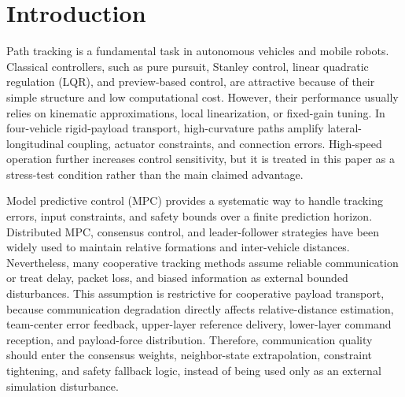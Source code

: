 \documentclass[twocolumn,3p,times,procedia]{elsarticle}
\newif\ifNRReview
\newcommand{\reviewblock}[1]{\ifNRReview\par\smallskip\noindent\begingroup\setlength{\fboxsep}{4pt}\colorbox{yellow!35}{\parbox{0.96\linewidth}{\footnotesize\textbf{当前不足：} #1}}\endgroup\par\smallskip\fi}
\newcommand{\AKE}{AKE-M}
\begin{document}
\reviewblock{回头弯同初始条件面板中，高曲率抗扰分支的团队中心横向 RMSE 降至 0.0851 m、峰值降至 0.1804 m，满足 0.2 m 内的峰值目标；但最终货物保护版本为了降低合力会牺牲部分横向误差，不能写成“全过程严格小于基线”。15 m/s 正弦已由进度过强版本更新为局部平衡版本，可跑完整且横向 RMSE 从 0.1586 m 降至 0.1574 m、纵向 RMSE 从 0.8857 m 降至 0.8815 m；但最大逐点正 gap 仍为 0.0041 m，因此只能写作 RMSE/峰值改善，不能写作全过程严格逐点优于基线。载荷力峰值在若干场景中高于 \AKE{}，因此受力指标仍应作为代价审计项。}


\section{Introduction}

Path tracking is a fundamental task in autonomous vehicles and mobile robots. Classical controllers, such as pure pursuit, Stanley control, linear quadratic regulation (LQR), and preview-based control, are attractive because of their simple structure and low computational cost. However, their performance usually relies on kinematic approximations, local linearization, or fixed-gain tuning. In four-vehicle rigid-payload transport, high-curvature paths amplify lateral-longitudinal coupling, actuator constraints, and connection errors. High-speed operation further increases control sensitivity, but it is treated in this paper as a stress-test condition rather than the main claimed advantage.

Model predictive control (MPC) provides a systematic way to handle tracking errors, input constraints, and safety bounds over a finite prediction horizon. Distributed MPC, consensus control, and leader-follower strategies have been widely used to maintain relative formations and inter-vehicle distances. Nevertheless, many cooperative tracking methods assume reliable communication or treat delay, packet loss, and biased information as external bounded disturbances. This assumption is restrictive for cooperative payload transport, because communication degradation directly affects relative-distance estimation, team-center error feedback, upper-layer reference delivery, lower-layer command reception, and payload-force distribution. Therefore, communication quality should enter the consensus weights, neighbor-state extrapolation, constraint tightening, and safety fallback logic, instead of being used only as an external simulation disturbance.
\end{document}
